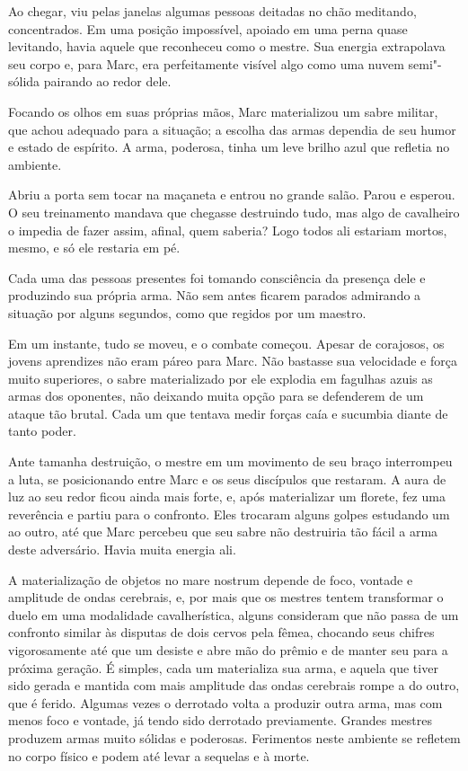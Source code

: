 Ao chegar, viu pelas janelas algumas pessoas deitadas no chão meditando,
concentrados. Em uma posição impossível, apoiado em uma perna quase
levitando, havia aquele que reconheceu como o mestre. Sua energia
extrapolava seu corpo e, para Marc, era perfeitamente visível algo como uma
nuvem semi"-sólida pairando ao redor dele.

Focando os olhos em suas próprias mãos, Marc materializou um sabre
militar, que achou adequado para a situação; a escolha das armas
dependia de seu humor e estado de espírito. A arma, poderosa, tinha um
leve brilho azul que refletia no ambiente.

Abriu a porta sem tocar na
maçaneta e entrou no grande salão. Parou e esperou.
O seu treinamento mandava que chegasse destruindo tudo, mas algo de
cavalheiro o impedia de fazer assim, afinal, quem saberia? Logo todos
ali estariam mortos, mesmo, e só ele restaria em pé.

Cada uma das pessoas presentes foi tomando consciência da presença dele
e produzindo sua própria arma. Não sem antes ficarem parados admirando a
situação por alguns segundos, como que regidos por um maestro.

Em um instante, tudo se moveu, e o combate começou. Apesar de corajosos,
os jovens aprendizes não eram páreo para Marc. Não bastasse sua
velocidade e força muito superiores, o sabre materializado por ele
explodia em fagulhas azuis as armas dos oponentes, não deixando muita
opção para se defenderem de um ataque tão brutal. Cada um que tentava
medir forças caía e sucumbia diante de tanto poder.

Ante tamanha destruição, o mestre em um movimento de seu braço
interrompeu a luta, se posicionando entre Marc e os seus discípulos que
restaram. A aura de luz ao seu redor ficou ainda mais forte, e, após
materializar um florete, fez uma reverência e partiu para o confronto.
Eles trocaram alguns golpes estudando um ao outro, até que Marc percebeu
que seu sabre não destruiria tão fácil a arma deste adversário. Havia
muita energia ali.

A materialização de objetos no mare nostrum depende de foco, vontade e
amplitude de ondas cerebrais, e, por mais que os mestres tentem transformar
o duelo em uma modalidade cavalherística, alguns consideram que não
passa de um confronto similar às disputas de dois cervos pela fêmea,
chocando seus chifres vigorosamente até que um desiste e abre mão do
prêmio e de manter seu  para a próxima geração. É simples, cada um
materializa sua arma, e aquela que tiver sido gerada e
mantida com mais amplitude das ondas cerebrais rompe a do outro, que é
ferido. Algumas vezes o derrotado volta a produzir outra arma, mas com
menos foco e vontade, já tendo sido derrotado previamente. Grandes
mestres produzem armas muito sólidas e poderosas. Ferimentos neste
ambiente se refletem no corpo físico e podem até levar a sequelas e à
morte.

